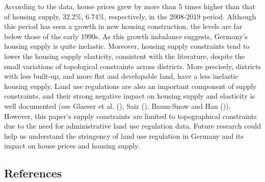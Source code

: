 \documentclass[
  12pt,
]{article}
\begin{document}
According to the data, house prices grew by more than 5 times higher than that of housing supply, 32.2\%, 6.74\%, respectively, in the 2008-2019 period. Although this period has seen a growth in new housing construction, the levels are far below those of the early 1990s. As this growth imbalance suggests, Germany's housing supply is quite inelastic. Moreover, housing supply constraints tend to lower the housing supply elasticity, consistent with the literature, despite the small variations of topological constraints across districts. More precisely, districts with less built-up, and more flat and developable land, have a less inelastic housing supply. Land use regulations are also an important component of supply constraints, and their strong negative impact on housing supply and elasticity is well documented (see Glaeser et al. (), Saiz (), Baum-Snow and Han ()). However, this paper's supply constraints are limited to topographical constraints due to the need for administrative land use regulation data. Future research could help us understand the stringency of land use regulation in Germany and its impact on house prices and housing supply.

\newpage

\subsection*{References}\label{references}
\end{document}
